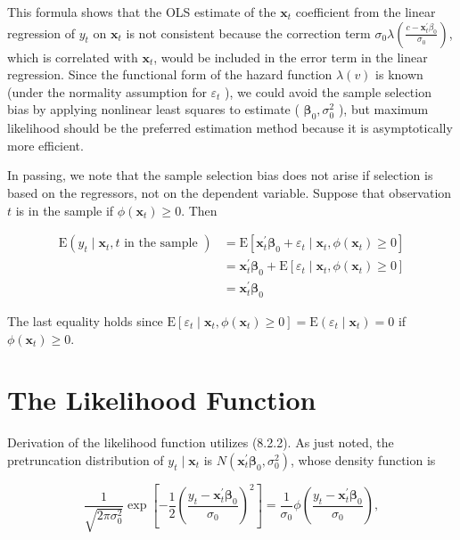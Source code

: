 \documentclass[10pt]{article}
\begin{document}
This formula shows that the OLS estimate of the $\mathbf{x}_{t}$ coefficient from the linear regression of $y_{t}$ on $\mathbf{x}_{t}$ is not consistent because the correction term $\sigma_{0} \lambda\left(\frac{c-\mathbf{x}_{t}^{\prime} \beta_{0}}{\sigma_{0}}\right)$, which is correlated with $\mathbf{x}_{t}$, would be included in the error term in the linear regression. Since the functional form of the hazard function $\lambda(v)$ is known (under the normality assumption for $\varepsilon_{t}$ ), we could avoid the sample selection bias by applying nonlinear least squares to estimate ( $\boldsymbol{\beta}_{0}, \sigma_{0}^{2}$ ), but maximum likelihood should be the preferred estimation method because it is asymptotically more efficient.

In passing, we note that the sample selection bias does not arise if selection is based on the regressors, not on the dependent variable. Suppose that observation $t$ is in the sample if $\phi\left(\mathbf{x}_{t}\right) \geq 0$. Then


\begin{align*}
\mathrm{E}\left(y_{t} \mid \mathbf{x}_{t}, t \text { in the sample }\right) & =\mathrm{E}\left[\mathbf{x}_{t}^{\prime} \boldsymbol{\beta}_{0}+\varepsilon_{t} \mid \mathbf{x}_{t}, \phi\left(\mathbf{x}_{t}\right) \geq 0\right] \\
& =\mathbf{x}_{t}^{\prime} \boldsymbol{\beta}_{0}+\mathrm{E}\left[\varepsilon_{t} \mid \mathbf{x}_{t}, \phi\left(\mathbf{x}_{t}\right) \geq 0\right] \\
& =\mathbf{x}_{t}^{\prime} \boldsymbol{\beta}_{0} \tag{8.2.8}
\end{align*}


The last equality holds since $\mathrm{E}\left[\varepsilon_{t} \mid \mathbf{x}_{t}, \phi\left(\mathbf{x}_{t}\right) \geq 0\right]=\mathrm{E}\left(\varepsilon_{t} \mid \mathbf{x}_{t}\right)=0$ if $\phi\left(\mathbf{x}_{t}\right) \geq 0$.

\section*{The Likelihood Function}
Derivation of the likelihood function utilizes (8.2.2). As just noted, the pretruncation distribution of $y_{t} \mid \mathbf{x}_{t}$ is $N\left(\mathbf{x}_{t}^{\prime} \boldsymbol{\beta}_{0}, \sigma_{0}^{2}\right)$, whose density function is


\begin{equation*}
\frac{1}{\sqrt{2 \pi \sigma_{0}^{2}}} \exp \left[-\frac{1}{2}\left(\frac{y_{t}-\mathbf{x}_{t}^{\prime} \boldsymbol{\beta}_{0}}{\sigma_{0}}\right)^{2}\right]=\frac{1}{\sigma_{0}} \phi\left(\frac{y_{t}-\mathbf{x}_{t}^{\prime} \boldsymbol{\beta}_{0}}{\sigma_{0}}\right), \tag{8.2.9}
\end{equation*}
\end{document}
